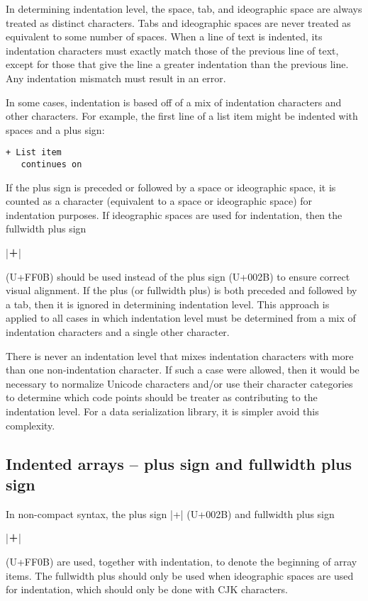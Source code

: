 \documentclass[11pt]{article}
\begin{document}
In determining indentation level, the space, tab, and ideographic space are always treated as distinct characters.  Tabs and ideographic spaces are never treated as equivalent to some number of spaces.  When a line of text is indented, its indentation characters must exactly match those of the previous line of text, except for those that give the line a greater indentation than the previous line.  Any indentation mismatch must result in an error.

In some cases, indentation is based off of a mix of indentation characters and other characters.  For example, the first line of a list item might be indented with spaces and a plus sign:
\begin{Verbatim}[showspaces]
 + List item
   continues on
\end{Verbatim}
If the plus sign is preceded or followed by a space or ideographic space, it is counted as a character (equivalent to a space or ideographic space) for indentation purposes.  If ideographic spaces are used for indentation, then the fullwidth plus sign \begin{CJK*}{UTF8}{gkai}|＋|\end{CJK*} (U+FF0B) should be used instead of the plus sign (U+002B) to ensure correct visual alignment.  If the plus (or fullwidth plus) is both preceded and followed by a tab, then it is ignored in determining indentation level.  This approach is applied to all cases in which indentation level must be determined from a mix of indentation characters and a single other character.

There is never an indentation level that mixes indentation characters with more than one non-indentation character.  If such a case were allowed, then it would be necessary to normalize Unicode characters and/or use their character categories to determine which code points should be treater as contributing to the indentation level.  For a data serialization library, it is simpler avoid this complexity.


\subsection{Indented arrays -- plus sign and fullwidth plus sign}

In non-compact syntax, the plus sign |+| (U+002B) and fullwidth plus sign \begin{CJK*}{UTF8}{gkai}|＋|\end{CJK*} (U+FF0B) are used, together with indentation, to denote the beginning of array items.  The fullwidth plus should only be used when ideographic spaces are used for indentation, which should only be done with CJK characters.
\end{document}
